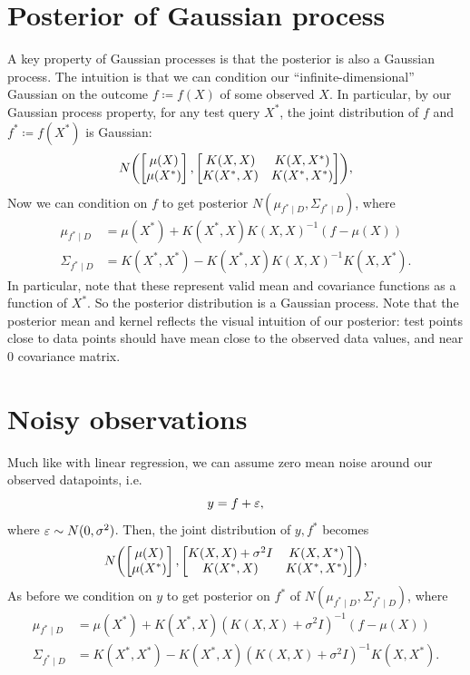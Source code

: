\documentclass{article}
\begin{document}
\section{Posterior of Gaussian process}
A key property of Gaussian processes is that the posterior is also a Gaussian process. The intuition is that we can condition our ``infinite-dimensional'' Gaussian on the outcome $f \coloneqq  f(X)$ of some observed $X$. In particular, by our Gaussian process property, for any test query $X^* $, the joint distribution of $f$ and $f^* \coloneqq f(X^* ) $ is Gaussian:
\[
    N\parens*{\begin{bmatrix}
         \mu (X) \\
         \mu (X^* ) \\
    \end{bmatrix}, 
    \begin{bmatrix}
        K(X, X) &  K(X, X^* ) \\
        K(X^* , X) &  K(X^* , X^* ) \\
    \end{bmatrix}},
\]
Now we can condition on $f$ to get posterior $N(\mu _{f^* \mid D} , \Sigma _{f^* \mid D})$, where 
\begin{align*}
    \mu _{f^* \mid D} &=  \mu (X^* ) + K(X^* , X) K(X, X)^{-1} (f- \mu (X))\\
    \Sigma _{f^* \mid D} &= K(X^* , X^* ) - K(X^* , X) K(X, X)^{-1} K(X, X^* ). 
\end{align*}
In particular, note that these represent valid mean and covariance functions as a function of $X^* $. So the posterior distribution is a Gaussian process. Note that the posterior mean and kernel reflects the visual intuition of our posterior: test points close to data points should have mean close to the observed data values, and near $0$ covariance matrix. 

\section{Noisy observations}
Much like with linear regression, we can assume zero mean noise around our observed datapoints, i.e. 
\[
    y = f + \varepsilon ,
\]
where $\varepsilon \sim N(0, \sigma ^2 )$. Then, the joint distribution of $y, f^* $ becomes
\[
    N\parens*{\begin{bmatrix}
         \mu (X) \\
         \mu (X^* ) \\
    \end{bmatrix}, 
    \begin{bmatrix}
        K(X, X) + \sigma ^2 I &  K(X, X^* ) \\
        K(X^* , X) &  K(X^* , X^* ) \\
    \end{bmatrix}},
\]
As before we condition on $y$ to get posterior on $f^* $ of $N(\mu _{f^* \mid D} , \Sigma _{f^* \mid D})$, where 
\begin{align*}
    \mu _{f^* \mid D} &=  \mu (X^* ) + K(X^* , X) (K(X, X) + \sigma ^2 I)^{-1} (f- \mu (X))\\
    \Sigma _{f^* \mid D} &= K(X^* , X^* ) - K(X^* , X) (K(X, X) + \sigma ^2 I)^{-1} K(X, X^* ). 
\end{align*}
\end{document}
